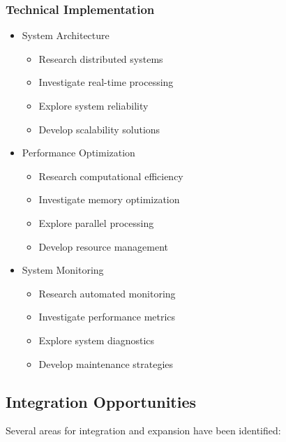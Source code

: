 \documentclass[conference]{IEEEtran}
\begin{document}
\subsubsection{Technical Implementation}
\begin{itemize}
    \item System Architecture
    \begin{itemize}
        \item Research distributed systems
        \item Investigate real-time processing
        \item Explore system reliability
        \item Develop scalability solutions
    \end{itemize}
    
    \item Performance Optimization
    \begin{itemize}
        \item Research computational efficiency
        \item Investigate memory optimization
        \item Explore parallel processing
        \item Develop resource management
    \end{itemize}
    
    \item System Monitoring
    \begin{itemize}
        \item Research automated monitoring
        \item Investigate performance metrics
        \item Explore system diagnostics
        \item Develop maintenance strategies
    \end{itemize}
\end{itemize}

\subsection{Integration Opportunities}
Several areas for integration and expansion have been identified:
\end{document}
